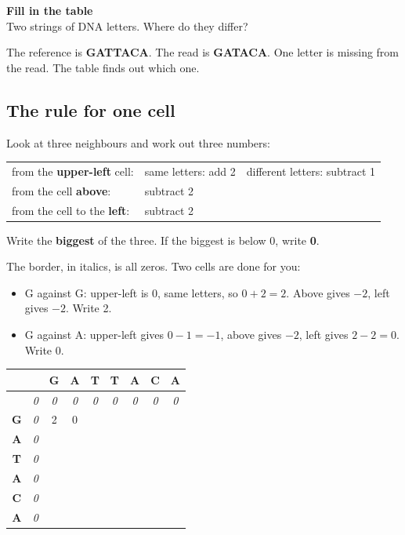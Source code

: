 \documentclass[12pt]{article}
\newcommand{\rowh}{\rule{0pt}{0.82cm}}
\begin{document}
\begin{center}
{\LARGE\bfseries Fill in the table}\\[4pt]
{\large Two strings of DNA letters. Where do they differ?}
\end{center}

\bigskip
\noindent
The reference is \textbf{GATTACA}. The read is \textbf{GATACA}. One letter is
missing from the read. The table finds out which one.

\subsection*{The rule for one cell}

Look at three neighbours and work out three numbers:

\begin{center}
\renewcommand{\arraystretch}{1.4}
\begin{tabular}{@{}lll@{}}
from the \textbf{upper-left} cell: & same letters: add 2 & different letters: subtract 1 \\
from the cell \textbf{above}: & subtract 2 & \\
from the cell to the \textbf{left}: & subtract 2 & \\
\end{tabular}
\end{center}

\noindent
Write the \textbf{biggest} of the three. If the biggest is below 0, write
\textbf{0}.

\medskip
\noindent
The border, in italics, is all zeros. Two cells are done for you:
\begin{itemize}[nosep]
\item G against G: upper-left is 0, same letters, so $0 + 2 = 2$. Above gives $-2$, left gives $-2$. Write 2.
\item G against A: upper-left gives $0 - 1 = -1$, above gives $-2$, left gives $2 - 2 = 0$. Write 0.
\end{itemize}

\medskip
\begin{center}
\renewcommand{\arraystretch}{1}
\begin{tabular}{|C|C||C|C|C|C|C|C|C|}
\hline
\rowh &  & \textbf{G} & \textbf{A} & \textbf{T} & \textbf{T} & \textbf{A} & \textbf{C} & \textbf{A} \\ \hline
\rowh & \textit{0} & \textit{0} & \textit{0} & \textit{0} & \textit{0} & \textit{0} & \textit{0} & \textit{0} \\ \hline\hline
\rowh \textbf{G} & \textit{0} & 2 & 0 & & & & & \\ \hline
\rowh \textbf{A} & \textit{0} & & & & & & & \\ \hline
\rowh \textbf{T} & \textit{0} & & & & & & & \\ \hline
\rowh \textbf{A} & \textit{0} & & & & & & & \\ \hline
\rowh \textbf{C} & \textit{0} & & & & & & & \\ \hline
\rowh \textbf{A} & \textit{0} & & & & & & & \\ \hline
\end{tabular}
\end{center}
\end{document}
